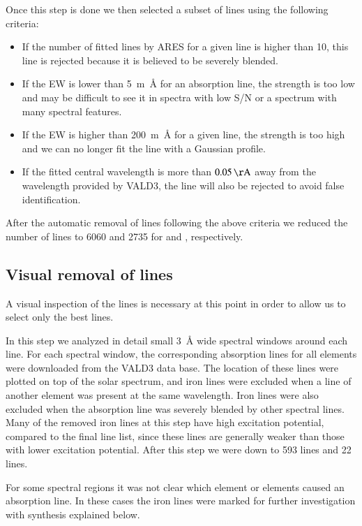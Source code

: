 \documentclass{aa}
\begin{document}
Once this step is done we then selected a subset of lines using the
following criteria:
\begin{itemize}
    \item If the number of fitted lines by ARES for a given line is higher than 10,
        this line is rejected because it is believed to be severely blended.
    \item If the EW is lower than \SI{5}{m\angstrom} for an absorption line, the strength
        is too low and may be difficult to see it in spectra with low S/N or a
        spectrum with many spectral features.
    \item If the EW is higher than \SI{200}{m\angstrom} for a given line, the strength
        is too high and we can no longer fit the line with a Gaussian profile.
    \item If the fitted central wavelength is more than $\SI{0.05}{\AA}$ away
        from the wavelength provided by VALD3, the line will also be rejected to
        avoid false identification.
\end{itemize}
After the automatic removal of lines following the above criteria
we reduced the number of lines to 6060 and 2735 for  and
, respectively.



\subsection{Visual removal of lines}
\label{sub:visual_removal_of_lines}

A visual inspection of the lines is necessary at this point in order to
allow us to select only the best lines.

In this step we analyzed in detail small \SI{3}{\angstrom} wide spectral
windows around each line. For each spectral window, the corresponding
absorption lines for all elements were downloaded from the VALD3 data
base. The location of these lines were plotted on top of the solar
spectrum, and iron lines were excluded when a line of another element
was present at the same wavelength. Iron lines were also excluded when
the absorption line was severely blended by other spectral lines. Many
of the removed iron lines at this step have high excitation potential,
compared to the final line list, since these lines are generally weaker
than those with lower excitation potential. After this step we were down
to 593  lines and 22  lines.

For some spectral regions it was not clear which element or elements
caused an absorption line. In these cases the iron lines were marked for
further investigation with synthesis explained below.
\end{document}
